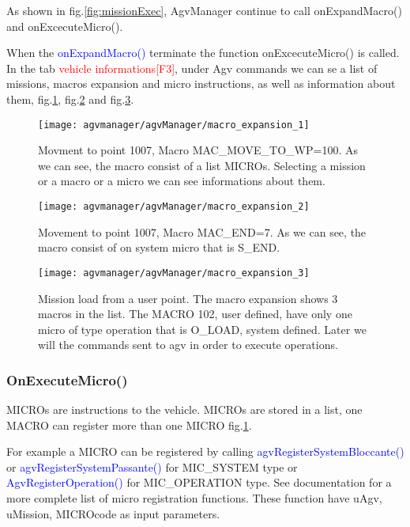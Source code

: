 As shown in fig.\ref{fig:missionExec}, AgvManager continue to call onExpandMacro() and onExcecuteMicro().

When the \textcolor{blue}{onExpandMacro()} terminate the function onExcecuteMicro() is called.\\

In the tab \textcolor{red}{vehicle informations[F3]}, under Agv commands we can se a list of missions, macros expansion and micro instructions, as well as information about them, fig.\ref{fig:macro_expansion_1}, fig.\ref{fig:macro_expansion_2} and fig.\ref{fig:macro_expansion_3}.\\

\begin{figure}
	\centering\texttt{[image: agvmanager/agvManager/macro\_expansion\_1]}
	\caption{Movment to point 1007, Macro MAC\_MOVE\_TO\_WP=100. As we can see, the macro consist of a list MICROs. Selecting a mission or a macro or a micro we can see informations about them.}
	\label{fig:macro_expansion_1}
\end{figure}
\begin{figure}
	\centering\texttt{[image: agvmanager/agvManager/macro\_expansion\_2]}
	\caption{Movement to point 1007, Macro MAC\_END=7. As we can see, the macro consist of on system micro that is S\_END.}
	\label{fig:macro_expansion_2}
\end{figure}
\begin{figure}
	\centering\texttt{[image: agvmanager/agvManager/macro\_expansion\_3]}
	\caption{Mission load from a user point. The macro expansion shows 3 macros in the list. The MACRO 102, user defined, have only one micro of type operation that is O\_LOAD, system defined. Later we will the commands sent to agv in order to execute operations.}
	\label{fig:macro_expansion_3}
\end{figure}



\subsubsection{OnExecuteMicro()}

MICROs are instructions to the vehicle. MICROs are stored in a list, one MACRO can register more than one MICRO fig.\ref{fig:macro_expansion_1}.

For example a MICRO can be registered by calling \textcolor{blue}{agvRegisterSystemBloccante()} or  \textcolor{blue}{agvRegisterSystemPassante()} for MIC\_SYSTEM type or \textcolor{blue}{AgvRegisterOperation()} for MIC\_OPERATION type. See documentation for a more complete list of micro registration functions.
These function have uAgv, uMission, MICROcode as input parameters.

